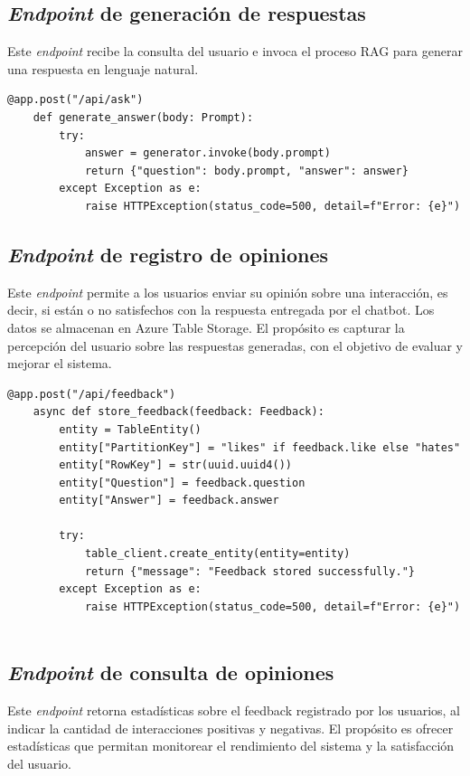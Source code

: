 \subsection{\textit{Endpoint} de generación de respuestas}

Este \textit{endpoint} recibe la consulta del usuario e invoca el proceso RAG para generar una respuesta en lenguaje natural.

\begin{lstlisting}[label=cod:api-1,caption=\textit{Endpoint} de generación de respuestas.]
	@app.post("/api/ask")
	def generate_answer(body: Prompt):
		try:
			answer = generator.invoke(body.prompt)
			return {"question": body.prompt, "answer": answer}
		except Exception as e:
			raise HTTPException(status_code=500, detail=f"Error: {e}")	
\end{lstlisting}

\subsection{\textit{Endpoint} de registro de opiniones}

Este \textit{endpoint} permite a los usuarios enviar su opinión sobre una interacción, es decir, si están o no satisfechos con 
la respuesta entregada por el chatbot. Los datos se almacenan en Azure Table Storage.
El propósito es capturar la percepción del usuario sobre las respuestas generadas, con el objetivo de evaluar y mejorar el sistema.

\begin{lstlisting}[label=cod:api-2,caption=\textit{Endpoint} de registro de opiniones.]
	@app.post("/api/feedback")
	async def store_feedback(feedback: Feedback):
		entity = TableEntity()
		entity["PartitionKey"] = "likes" if feedback.like else "hates"
		entity["RowKey"] = str(uuid.uuid4())
		entity["Question"] = feedback.question
		entity["Answer"] = feedback.answer
	
		try:
			table_client.create_entity(entity=entity)
			return {"message": "Feedback stored successfully."}
		except Exception as e:
			raise HTTPException(status_code=500, detail=f"Error: {e}")
	
\end{lstlisting}

\subsection{\textit{Endpoint} de consulta de opiniones}

Este \textit{endpoint} retorna estadísticas sobre el feedback registrado por los usuarios, al indicar la cantidad de interacciones 
positivas y negativas. El propósito es ofrecer estadísticas que permitan monitorear el rendimiento del sistema y 
la satisfacción del usuario.

